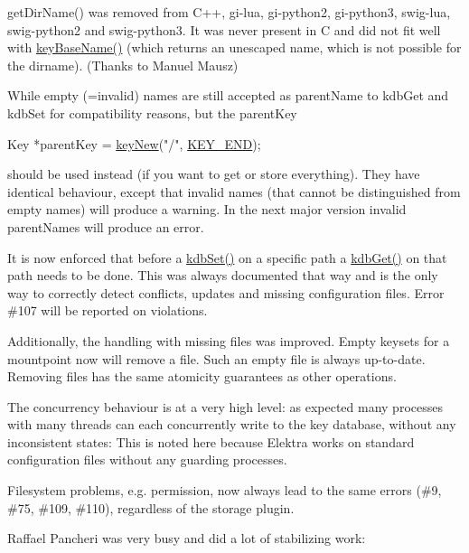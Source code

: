 get\+Dir\+Name() was removed from C++, gi-\/lua, gi-\/python2, gi-\/python3, swig-\/lua, swig-\/python2 and swig-\/python3. It was never present in C and did not fit well with \hyperlink{group__keyname_gaaff35e7ca8af5560c47e662ceb9465f5}{key\+Base\+Name()} (which returns an unescaped name, which is not possible for the dirname). (Thanks to Manuel Mausz)

While empty (=invalid) names are still accepted as parent\+Name to {\ttfamily kdb\+Get} and {\ttfamily kdb\+Set} for compatibility reasons, but the parent\+Key


\begin{DoxyCode}
Key *parentKey = \hyperlink{group__key_gad23c65b44bf48d773759e1f9a4d43b89}{keyNew}(\textcolor{stringliteral}{"/"}, \hyperlink{group__key_gga9b703ca49f48b482def322b77d3e6bc8aa8adb6fcb92dec58fb19410eacfdd403}{KEY\_END});
\end{DoxyCode}


should be used instead (if you want to get or store everything). They have identical behaviour, except that invalid names (that cannot be distinguished from empty names) will produce a warning. In the next major version invalid parent\+Names will produce an error.

It is now enforced that before a \hyperlink{group__kdb_ga11436b058408f83d303ca5e996832bcf}{kdb\+Set()} on a specific path a \hyperlink{group__kdb_ga28e385fd9cb7ccfe0b2f1ed2f62453a1}{kdb\+Get()} on that path needs to be done. This was always documented that way and is the only way to correctly detect conflicts, updates and missing configuration files. Error \#107 will be reported on violations.

Additionally, the handling with missing files was improved. Empty keysets for a mountpoint now will remove a file. Such an empty file is always up-\/to-\/date. Removing files has the same atomicity guarantees as other operations.

The concurrency behaviour is at a very high level\+: as expected many processes with many threads can each concurrently write to the key database, without any inconsistent states\+: This is noted here because Elektra works on standard configuration files without any guarding processes.

Filesystem problems, e.\+g. permission, now always lead to the same errors (\#9, \#75, \#109, \#110), regardless of the storage plugin.

Raffael Pancheri was very busy and did a lot of stabilizing work\+:


